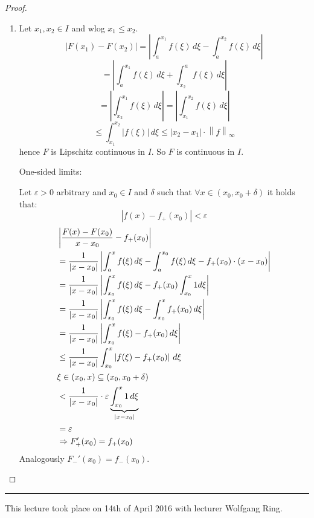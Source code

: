 \documentclass[a4paper,landscape,twocolumn]{article}
\theoremstyle{definition}
\newcommand\abs[1]{\left|#1\right|}
\newcommand\meta[3]{\hrule{} This #1 took place on #2 with lecturer #3.\par}
\newcommand\norm[1]{\left\|#1\right\|}
\begin{document}
\begin{proof}
  \begin{enumerate}
    \item Let $x_1, x_2 \in I$ and wlog $x_1 \leq x_2$.
      \[ \abs{F(x_1) - F(x_2)} = \abs{\int_a^{x_1} f(\xi) \, d\xi - \int_a^{x_2} f(\xi) \, d\xi} \]
      \[ = \abs{\int_a^{x_1} f(\xi) \, d\xi + \int_{x_2}^a f(\xi) \, d\xi} \]
      \[ = \abs{\int_{x_2}^{x_1} f(\xi) \, d\xi} = \abs{\int_{x_1}^{x_2} f(\xi) \, d\xi} \]
      \[ \leq \int_{x_1}^{x_2} \abs{f(\xi)} \, d\xi \leq \abs{x_2 - x_1} \cdot \norm{f}_\infty \]
      hence $F$ is Lipschitz continuous in $I$.
      So $F$ is continuous in $I$.

      One-sided limits:

      Let $\varepsilon > 0$ arbitrary and $x_0 \in I$ and $\delta$ such that $\forall x \in (x_0, x_0 + \delta)$ it holds that:
      \[ \abs{f(x) - f_+(x_0)} < \varepsilon \]
      \begin{align*}
        &\abs{\frac{F(x) - F(x_0)}{x - x_0} - f_+(x_0)} \\
        &= \frac{1}{\abs{x - x_0}} \abs{\int_a^x f(\xi) \, d\xi - \int_a^{x_0} f(\xi) \, d\xi - f_+(x_0) \cdot (x - x_0)} \\
        &= \frac{1}{\abs{x - x_0}} \abs{\int_{x_0}^x f(\xi) \, d\xi - f_+(x_0) \int_{x_0}^x 1 d\xi} \\
        &= \frac{1}{\abs{x - x_0}} \abs{\int_{x_0}^x f(\xi) \, d\xi - \int_{x_0}^x f_+(x_0) \, d\xi} \\
        &= \frac{1}{\abs{x - x_0}} \abs{\int_{x_0}^x f(\xi) - f_+(x_0) \, d\xi} \\
        &\leq \frac{1}{\abs{x - x_0}} \int_{x_0}^x \abs{f(\xi) - f_+(x_0)} \, d\xi \\
      \intertext{$\xi \in (x_0, x) \subseteq (x_0, x_0 + \delta)$}
        &< \frac{1}{\abs{x - x_0}} \cdot \varepsilon \underbrace{\int_{x_0}^x 1 \, d\xi}_{\abs{x - x_0}} \\
        &= \varepsilon \\
        &\Rightarrow F_+'(x_0) = f_+(x_0)
      \end{align*}
      Analogously $F_-'(x_0) = f_-(x_0)$.
  \end{enumerate}
\end{proof}

\meta{lecture}{14th of April 2016}{Wolfgang Ring}
\end{document}
